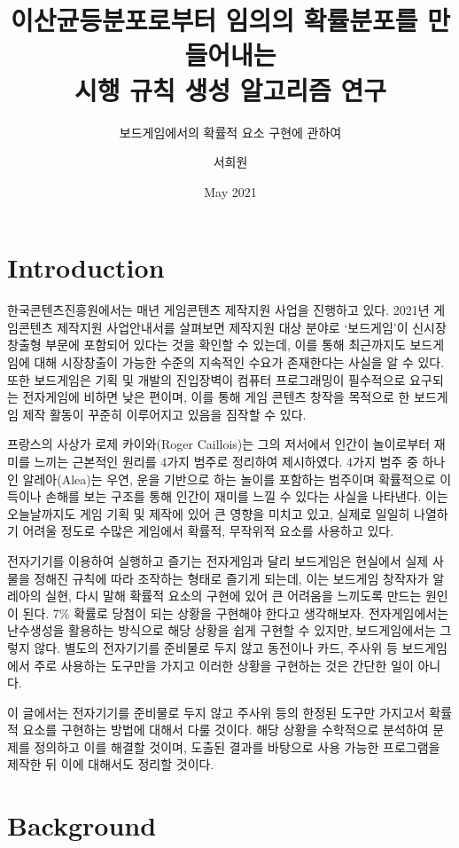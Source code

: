 \documentclass[11pt]{article}
\title{이산균등분포로부터 임의의 확률분포를 만들어내는\\시행 규칙 생성 알고리즘 연구}
\subtitle{보드게임에서의 확률적 요소 구현에 관하여}
\author{서희원}
\date{May 2021}
\begin{document}
\maketitle
\doublespacing
\newpage

\tableofcontents
\newpage

\section{Introduction}
한국콘텐츠진흥원에서는 매년 게임콘텐츠 제작지원 사업을 진행하고 있다. 2021년 게임콘텐츠 제작지원 사업안내서를 살펴보면 제작지원 대상 분야로 `보드게임'이 신시장창출형 부문에 포함되어 있다는 것\cite{contents2021}을 확인할 수 있는데, 이를 통해 최근까지도 보드게임에 대해 시장창출이 가능한 수준의 지속적인 수요가 존재한다는 사실을 알 수 있다. 또한 보드게임은 기획 및 개발의 진입장벽이 컴퓨터 프로그래밍이 필수적으로 요구되는 전자게임에 비하면 낮은 편이며, 이를 통해 게임 콘텐츠 창작을 목적으로 한 보드게임 제작 활동이 꾸준히 이루어지고 있음을 짐작할 수 있다.

프랑스의 사상가 로제 카이와(Roger Caillois)는 그의 저서에서 인간이 놀이로부터 재미를 느끼는 근본적인 원리를 4가지 범주로 정리하여 제시하였다.\cite{roger} 4가지 범주 중 하나인 알레아(Alea)는 우연, 운을 기반으로 하는 놀이를 포함하는 범주이며 확률적으로 이득이나 손해를 보는 구조를 통해 인간이 재미를 느낄 수 있다는 사실을 나타낸다. 이는 오늘날까지도 게임 기획 및 제작에 있어 큰 영향을 미치고 있고, 실제로 일일히 나열하기 어려울 정도로 수많은 게임에서 확률적, 무작위적 요소를 사용하고 있다.

전자기기를 이용하여 실행하고 즐기는 전자게임과 달리 보드게임은 현실에서 실제 사물을 정해진 규칙에 따라 조작하는 형태로 즐기게 되는데, 이는 보드게임 창작자가 알레아의 실현, 다시 말해 확률적 요소의 구현에 있어 큰 어려움을 느끼도록 만드는 원인이 된다. 7\% 확률로 당첨이 되는 상황을 구현해야 한다고 생각해보자. 전자게임에서는 난수생성을 활용하는 방식으로 해당 상황을 쉽게 구현할 수 있지만, 보드게임에서는 그렇지 않다. 별도의 전자기기를 준비물로 두지 않고 동전이나 카드, 주사위 등 보드게임에서 주로 사용하는 도구만을 가지고 이러한 상황을 구현하는 것은 간단한 일이 아니다.

이 글에서는 전자기기를 준비물로 두지 않고 주사위 등의 한정된 도구만 가지고서 확률적 요소를 구현하는 방법에 대해서 다룰 것이다. 해당 상황을 수학적으로 분석하여 문제를 정의하고 이를 해결할 것이며, 도출된 결과를 바탕으로 사용 가능한 프로그램을 제작한 뒤 이에 대해서도 정리할 것이다.

\section{Background}
\end{document}
